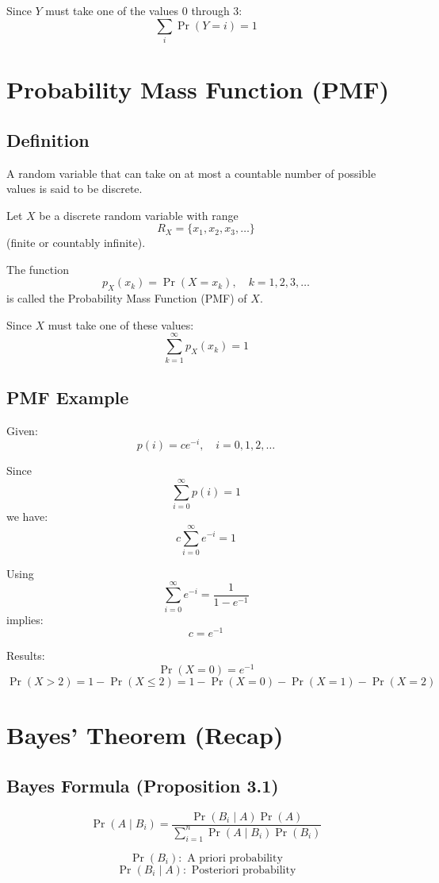 \documentclass[11pt]{article}
\begin{document}
Since $Y$ must take one of the values 0 through 3:
\[
\sum_{i} \Pr(Y=i) = 1
\]

\section{Probability Mass Function (PMF)}

\subsection{Definition}

A random variable that can take on at most a countable number of possible values is said to be discrete.

Let $X$ be a discrete random variable with range
\[
R_X = \{x_1, x_2, x_3, \ldots\}
\]
(finite or countably infinite).

The function
\[
p_X(x_k) = \Pr(X = x_k), \quad k = 1,2,3,\ldots
\]
is called the Probability Mass Function (PMF) of $X$.

Since $X$ must take one of these values:
\[
\sum_{k=1}^{\infty} p_X(x_k) = 1
\]

\subsection{PMF Example}

Given:
\[
p(i) = c e^{-i}, \quad i = 0,1,2,\ldots
\]

Since
\[
\sum_{i=0}^{\infty} p(i) = 1
\]
we have:
\[
c \sum_{i=0}^{\infty} e^{-i} = 1
\]

Using
\[
\sum_{i=0}^{\infty} e^{-i} = \frac{1}{1-e^{-1}}
\]
implies:
\[
c = e^{-1}
\]

Results:
\[
\Pr(X=0) = e^{-1}
\]
\[
\Pr(X>2) = 1 - \Pr(X \le 2) = 1 - \Pr(X=0) - \Pr(X=1) - \Pr(X=2)
\]

\section{Bayes' Theorem (Recap)}

\subsection{Bayes Formula (Proposition 3.1)}

\[
\Pr(A \mid B_i) =
\frac{\Pr(B_i \mid A)\Pr(A)}
{\sum_{i=1}^{n} \Pr(A \mid B_i)\Pr(B_i)}
\]

\[
\Pr(B_i): \text{ A priori probability}
\]
\[
\Pr(B_i \mid A): \text{ Posteriori probability}
\]
\end{document}
